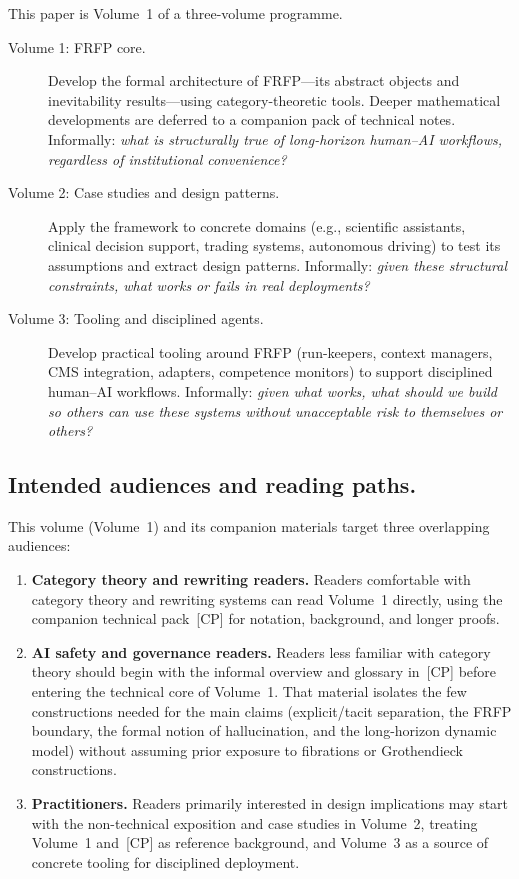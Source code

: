 \documentclass[preprints,accept]{Definitions/mdpi}
\theoremstyle{definition}
\begin{document}
This paper is Volume~1 of a three-volume programme.

\begin{description}
  \item[Volume 1: FRFP core.] Develop the formal architecture of FRFP---its abstract objects and inevitability results---using category-theoretic tools. Deeper mathematical developments are deferred to a companion pack of technical notes. Informally: \emph{what is structurally true of long-horizon human--AI workflows, regardless of institutional convenience?}

  \item[Volume 2: Case studies and design patterns.] Apply the framework to concrete domains (e.g., scientific assistants, clinical decision support, trading systems, autonomous driving) to test its assumptions and extract design patterns. Informally: \emph{given these structural constraints, what works or fails in real deployments?}

  \item[Volume 3: Tooling and disciplined agents.] Develop practical tooling around FRFP (run-keepers, context managers, CMS integration, adapters, competence monitors) to support disciplined human--AI workflows. Informally: \emph{given what works, what should we build so others can use these systems without unacceptable risk to themselves or others?}
\end{description}


\subsection{Intended audiences and reading paths.}
This volume (Volume~1) and its companion materials target three overlapping audiences:
\begin{enumerate}
  \item \textbf{Category theory and rewriting readers.} Readers comfortable with category theory and rewriting systems can read Volume~1 directly, using the companion technical pack~[CP] for notation, background, and longer proofs.
  \item \textbf{AI safety and governance readers.} Readers less familiar with category theory should begin with the informal overview and glossary in~[CP] before entering the technical core of Volume~1. That material isolates the few constructions needed for the main claims (explicit/tacit separation, the FRFP boundary, the formal notion of hallucination, and the long-horizon dynamic model) without assuming prior exposure to fibrations or Grothendieck constructions.
  \item \textbf{Practitioners.} Readers primarily interested in design implications may start with the non-technical exposition and case studies in Volume~2, treating Volume~1 and~[CP] as reference background, and Volume~3 as a source of concrete tooling for disciplined deployment.
\end{enumerate}
\end{document}
